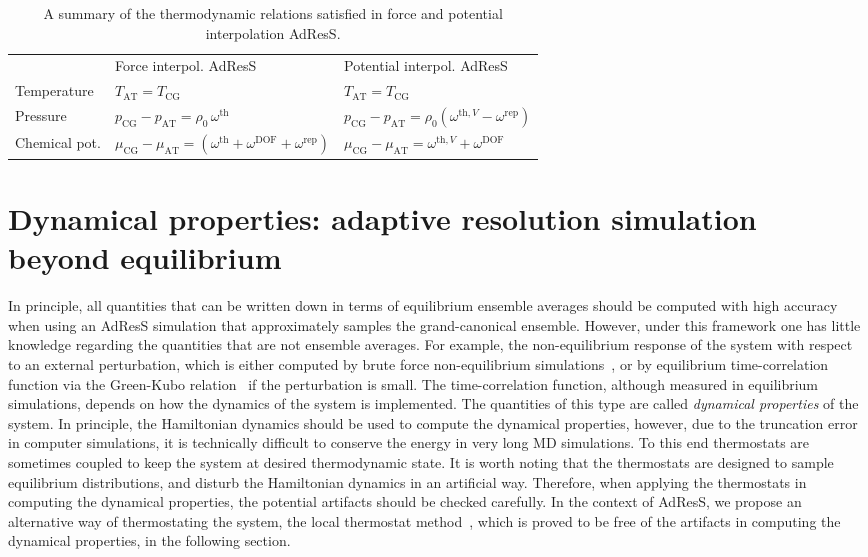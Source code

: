 \documentclass[epjST]{svjour}
\newcommand{\AT}[0]{\textrm{AT}}
\newcommand{\CG}[0]{\textrm{CG}}
\newcommand{\thf}{{\textrm{th}}}
\newcommand{\rep}{{\textrm{rep}}}
\newcommand{\dof}{{\textrm{DOF}}}
\begin{document}
\begin{table}
  \centering
  \caption{A summary of the thermodynamic relations satisfied in force and potential interpolation AdResS.}
  \label{tab:thermodynamic}
  \begin{tabular*}{0.99\textwidth}{@{\extracolsep{\fill}}lll}\hline\hline
    &         Force interpol. AdResS     &       Potential interpol. AdResS \\
    Temperature    &   {$T_\AT = T_\CG$}                                                & {$T_\AT = T_\CG$}                                        \\
    Pressure       &   {$p_\CG - p_\AT = \rho_0\, \omega^\thf$}                          & {$p_\CG - p_\AT = \rho_0(\omega^{\thf,V} - \omega^\rep)$} \\
    Chemical pot.  &   {$\mu_\CG - \mu_\AT = (\omega^\thf + \omega^\dof +\omega^\rep)$}   & {$\mu_\CG - \mu_\AT = \omega^{\thf,V}+ \omega^\dof$}      \\\hline\hline
  \end{tabular*}
\end{table}


\section{Dynamical properties: adaptive resolution simulation beyond equilibrium}
\label{sec:dynamical}


In principle, all quantities that
can be written down in terms of equilibrium ensemble averages should
be computed with high accuracy when using an AdResS simulation that approximately samples the grand-canonical ensemble.
However, under this framework one has little knowledge regarding the quantities
that are not ensemble averages.
For example, the non-equilibrium response of the system
with respect to an external perturbation, which is 
either computed by brute force non-equilibrium simulations~\cite{wang2014exploring}, or by
equilibrium time-correlation function via the Green-Kubo
relation~\cite{green1954markoff,kubo1957statistical} if the perturbation is small. The
time-correlation function, although measured in equilibrium
simulations, depends on how the dynamics
of the system is implemented.
The quantities of this type are called \emph{dynamical properties} of the system.
In principle, the Hamiltonian dynamics should be used to compute the dynamical properties,
however, due to the truncation error in computer simulations, it
is technically difficult to conserve the energy in very long MD simulations.
To this end thermostats are sometimes coupled to keep the system at desired thermodynamic
state.
It is worth noting that the thermostats are designed to sample equilibrium distributions, and 
disturb the Hamiltonian dynamics in an artificial way.
Therefore, when applying the thermostats
in computing the dynamical properties, the potential artifacts
should be checked carefully.
In the context of AdResS, we propose an alternative way of thermostating
the system, the local thermostat method~\cite{wang2014exploring},
which is proved to be free of the artifacts in computing the dynamical properties, in the following section.
\end{document}
